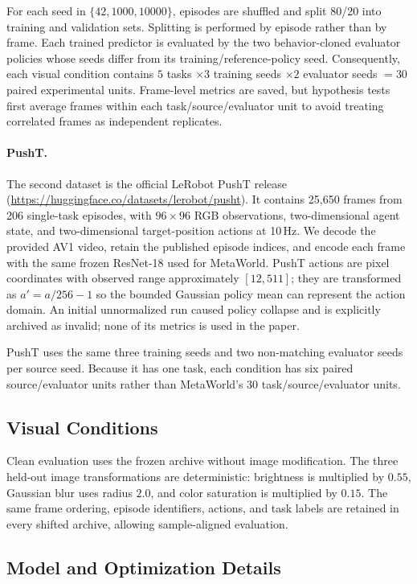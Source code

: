 \documentclass[10pt,twocolumn]{article}
\theoremstyle{tightstyle}
\begin{document}
For each seed in $\{42,1000,10000\}$, episodes are shuffled and split 80/20 into
training and validation sets. Splitting is performed by episode rather than by
frame. Each trained predictor is evaluated by the two behavior-cloned evaluator
policies whose seeds differ from its training/reference-policy seed. Consequently,
each visual condition contains
$5$ tasks $\times 3$ training seeds $\times 2$ evaluator seeds $=30$ paired
experimental units. Frame-level metrics are saved, but hypothesis tests first
average frames within each task/source/evaluator unit to avoid treating correlated
frames as independent replicates.

\paragraph{PushT.}
The second dataset is the official LeRobot PushT release
(\url{https://huggingface.co/datasets/lerobot/pusht}). It contains 25,650 frames
from 206 single-task episodes, with $96\times96$ RGB observations,
two-dimensional agent state, and two-dimensional target-position actions at
10\,Hz. We decode the provided AV1 video, retain the published episode indices,
and encode each frame with the same frozen ResNet-18 used for MetaWorld. PushT
actions are pixel coordinates with observed range approximately $[12,511]$; they
are transformed as $a'=a/256-1$ so the bounded Gaussian policy mean can represent
the action domain. An initial unnormalized run caused policy collapse and is
explicitly archived as invalid; none of its metrics is used in the paper.

PushT uses the same three training seeds and two non-matching evaluator seeds per
source seed. Because it has one task, each condition has six paired
source/evaluator units rather than MetaWorld's 30 task/source/evaluator units.

\subsection{Visual Conditions}

Clean evaluation uses the frozen archive without image modification. The three
held-out image transformations are deterministic: brightness is multiplied by
$0.55$, Gaussian blur uses radius $2.0$, and color saturation is multiplied by
$0.15$. The same frame ordering, episode identifiers, actions, and task labels are
retained in every shifted archive, allowing sample-aligned evaluation.

\subsection{Model and Optimization Details}
\end{document}
